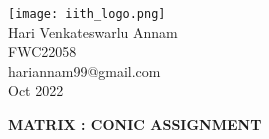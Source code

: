 \documentclass[10pt,a4paper]{report}
\begin{document}
\begin{multicols}{2}
\raggedright {\texttt{[image: iith\_logo.png]}} \vspace{3mm}\\ \raggedleft Hari Venkateswarlu Annam\vspace{2mm}\\ 
\raggedleft  FWC22058\vspace{2mm}\\ 
\raggedleft hariannam99@gmail.com \vspace{2mm}\\ 
\raggedleft Oct 2022 \vspace{5mm}\\
\end{multicols}

\centering \Large \textbf{MATRIX : CONIC ASSIGNMENT} \normalsize \vspace{10mm}
\end{document}
